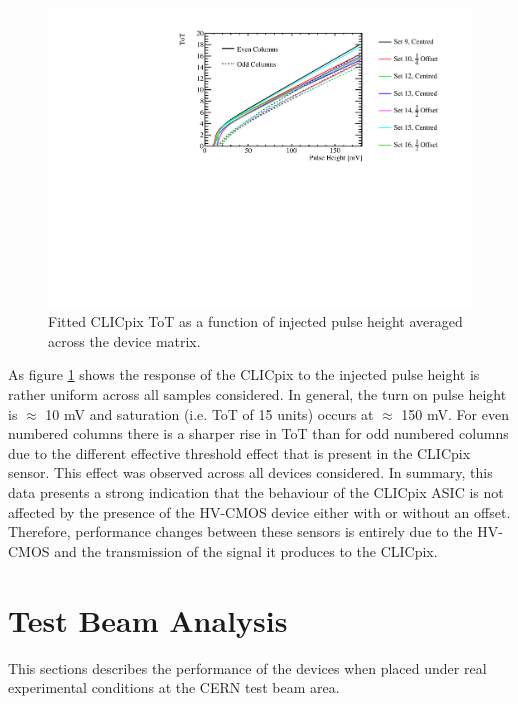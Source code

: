 \begin{figure}
\centering
\includegraphics[width=1.0\textwidth]{CLICdpVertex/Plots/TestPulseCalibration/FitParam/AverageToT_vs_InjectedPulseHeight.pdf}
\caption[Fitted CLICpix ToT as a function of injected pulse height averaged across the device matrix.]{Fitted CLICpix ToT as a function of injected pulse height averaged across the device matrix.}
\label{fig:testpulsemeanfit}
\end{figure}

As figure \ref{fig:testpulsemeanfit} shows the response of the CLICpix to the injected pulse height is rather uniform across all samples considered.  In general, the turn on pulse height is $\approx$ 10 mV and saturation (i.e. ToT of 15 units) occurs at $\approx$ 150 mV.  For even numbered columns there is a sharper rise in ToT than for odd numbered columns due to the different effective threshold effect that is present in the CLICpix sensor.  This effect was observed across all devices considered.  In summary, this data presents a strong indication that the behaviour of the CLICpix ASIC is not affected by the presence of the HV-CMOS device either with or without an offset.  Therefore, performance changes between these sensors is entirely due to the HV-CMOS and the transmission of the signal it produces to the CLICpix.  


\section{Test Beam Analysis}
\label{sec:testbeam}
This sections describes the performance of the devices when placed under real experimental conditions at the CERN test beam area.  

